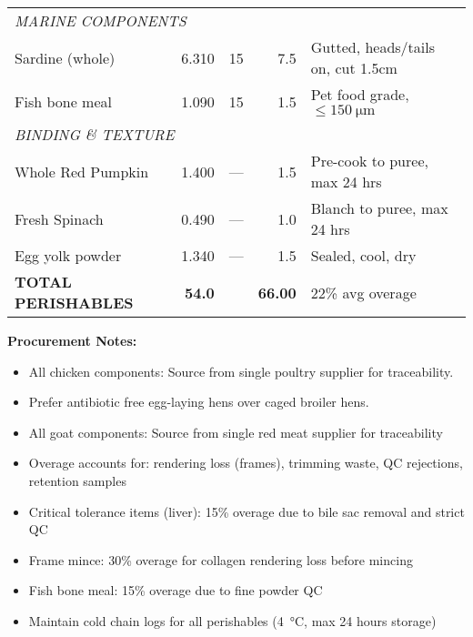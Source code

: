\begin{table}[h]
\begin{tabular}{@{}lrrrp{5cm}@{}}
\midrule
\multicolumn{5}{l}{\textit{MARINE COMPONENTS}} \\
Sardine (whole) & 6.310 & 15 & 7.5 & Gutted, heads/tails on, cut 1.5cm \\
Fish bone meal & 1.090 & 15 & 1.5 & Pet food grade, $\le \SI{150}{\micro\meter}$ \\
\midrule
\multicolumn{5}{l}{\textit{BINDING \& TEXTURE}} \\
Whole Red Pumpkin & 1.400 & --- & 1.5 & Pre-cook to puree, max 24 hrs \\
Fresh Spinach & 0.490 & --- & 1.0 & Blanch to puree, max 24 hrs\\
Egg yolk powder & 1.340 & --- & 1.5 & Sealed, cool, dry \\
\midrule
\textbf{TOTAL PERISHABLES} & \textbf{54.0} & & \textbf{66.00} & 22\% avg overage \\
\bottomrule
\end{tabular}
\end{table}

\vspace{1em}

\textbf{Procurement Notes:}
\begin{itemize}
\item All chicken components: Source from single poultry supplier for traceability. 
\item Prefer antibiotic free egg-laying hens over caged broiler hens.
\item All goat components: Source from single red meat supplier for traceability
\item Overage accounts for: rendering loss (frames), trimming waste, QC rejections, retention samples
\item Critical tolerance items (liver): 15\% overage due to bile sac removal and strict QC
\item Frame mince: 30\% overage for collagen rendering loss before mincing
\item Fish bone meal: 15\% overage due to fine powder QC
\item Maintain cold chain logs for all perishables (\SI{4}{\celsius}, max 24 hours storage)
\end{itemize}

